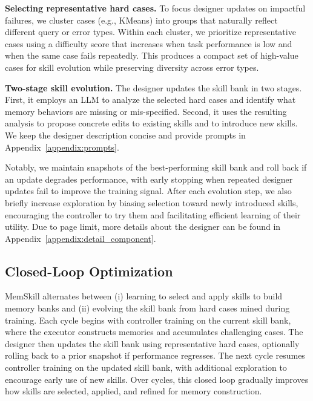 \textbf{Selecting representative hard cases.} To focus designer updates on impactful failures, we cluster cases (e.g., KMeans) into groups that naturally reflect different query or error types. Within each cluster, we prioritize representative cases using a difficulty score that increases when task performance is low and when the same case fails repeatedly. This produces a compact set of high-value cases for skill evolution while preserving diversity across error types. 



\textbf{Two-stage skill evolution.} The designer updates the skill bank in two stages. First, it employs an LLM to analyze the selected hard cases and identify what memory behaviors are missing or mis-specified. Second, it uses the resulting analysis to propose concrete edits to existing skills and to introduce new skills. We keep the designer description concise and provide prompts in Appendix~\ref{appendix:prompts}.





Notably, we maintain snapshots of the best-performing skill bank and roll back if an update degrades performance, with early stopping when repeated designer updates fail to improve the training signal. After each evolution step, we also briefly increase exploration by biasing selection toward newly introduced skills, encouraging the controller to try them and facilitating efficient learning of their utility.
Due to page limit, more details about the designer can be found in Appendix~\ref{appendix:detail_component}.



\subsection{Closed-Loop Optimization}\label{sec:closed_loop}


MemSkill alternates between (i) learning to select and apply skills to build memory banks and (ii) evolving the skill bank from hard cases mined during training. Each cycle begins with controller training on the current skill bank, where the executor constructs memories and accumulates challenging cases. The designer then updates the skill bank using representative hard cases, optionally rolling back to a prior snapshot if performance regresses. The next cycle resumes controller training on the updated skill bank, with additional exploration to encourage early use of new skills. Over cycles, this closed loop gradually improves how skills are selected, applied, and refined for memory construction.



